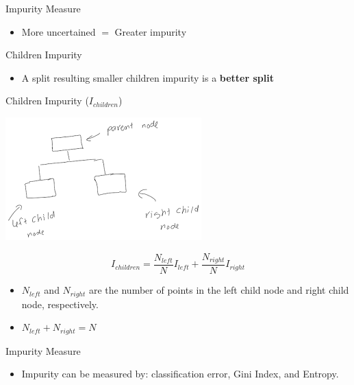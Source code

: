 \documentclass[
  ignorenonframetext,
]{beamer}
\providecommand{\tightlist}{%
  \setlength{\itemsep}{0pt}\setlength{\parskip}{0pt}}
\begin{document}
\begin{frame}{Impurity Measure}
\protect\hypertarget{impurity-measure-2}{}

\begin{itemize}
\tightlist
\item
  More uncertained \(=\) Greater impurity
\end{itemize}

\end{frame}

\begin{frame}{Children Impurity}
\protect\hypertarget{children-impurity}{}

\begin{itemize}
\tightlist
\item
  A split resulting smaller children impurity is a \textbf{better split}
\end{itemize}

\end{frame}

\begin{frame}{Children Impurity (\(I_{children}\))}
\protect\hypertarget{children-impurity-i_children}{}

\includegraphics{images2/parent_child.png}

\[
I_{children} = \frac{N_{left}}{N}I_{left} + \frac{N_{right}}{N}I_{right}
\]

\begin{itemize}
\tightlist
\item
  \(N_{left}\) and \(N_{right}\) are the number of points in the left
  child node and right child node, respectively.
\item
  \(N_{left}+N_{right}=N\)
\end{itemize}

\end{frame}

\begin{frame}{Impurity Measure}
\protect\hypertarget{impurity-measure-3}{}

\begin{itemize}
\tightlist
\item
  Impurity can be measured by: classification error, Gini Index, and
  Entropy.
\end{itemize}

\end{frame}
\end{document}
